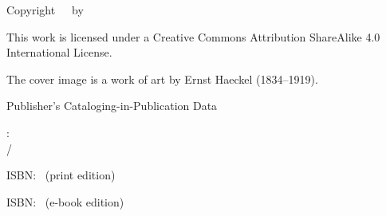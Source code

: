 \bigskip

Copyright\ \textcopyright\ \TheCopyrightYear\ by \TheAuthor

\bigskip

This work is licensed under a Creative Commons Attribution ShareAlike 4.0 International License.

The cover image is a work of art by Ernst Haeckel (1834–1919).

\bigskip

%

\vspace*{5cm}

\bigskip
Publisher's Cataloging-in-Publication Data

\bigskip
\TheAuthorLNF

\TheMainTitle: \\ \hspace*{10mm}\TheSubTitle / \TheAuthorLNF



ISBN: \PrintISBN\, (print edition) 

ISBN: \EbookISBN\, (e-book edition)

%
\bigskip

	\TheEdition

